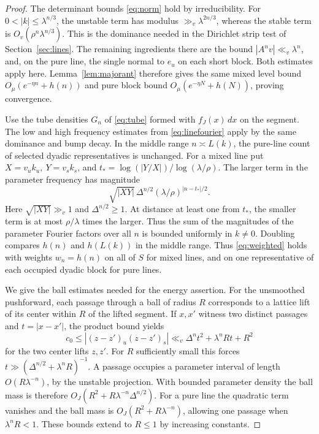 \documentclass[11pt,a4paper,reqno]{amsart}
\theoremstyle{definition}
\theoremstyle{remark}
\numberwithin{equation}{section}
\begin{document}
\begin{proof}
The determinant bounds \eqref{eq:norm} hold by irreducibility.
For \(0<|k|\le\lambda^{n/3}\), the unstable term has modulus
\(\gg_v\lambda^{2n/3}\), whereas the stable term is
\(O_v(\rho^n\lambda^{n/3})\). This is the dominance needed
in the Dirichlet strip test of Section~\ref{sec:lines}.
The remaining ingredients there are the bound
\(|A^n v|\ll_v\lambda^n\), and, on the pure line, the single
normal to \(e_u\) on each short block. Both estimates apply
here. Lemma~\ref{lem:majorant} therefore gives the same mixed
level bound \(O_\mu(e^{-\eta n}+h(n))\) and pure block bound
\(O_\mu(e^{-\eta N}+h(N))\), proving convergence.

Use the tube densities \(G_n\) of \eqref{eq:tube} formed with
\(f_J(x)\,dx\) on the segment. The low and high frequency
estimates from \eqref{eq:linefourier} apply by the same dominance
and bump decay. In the middle range \(n\asymp L(k)\), the
pure-line count of selected dyadic representatives is unchanged.
For a mixed line put
\(X=v_u k_u,\ Y=v_s k_s\), and
\(t_*=\log(|Y/X|)/\log(\lambda/\rho)\). The larger term in the
parameter frequency has magnitude
\[
 \sqrt{|XY|}\,\Delta^{n/2}(\lambda/\rho)^{|n-t_*|/2}.
\]
Here \(\sqrt{|XY|}\gg_v1\) and \(\Delta^{n/2}\ge1\). At distance
at least one from \(t_*\), the smaller term is at most
\(\rho/\lambda\) times the larger. Thus the sum of the magnitudes
of the parameter Fourier factors over all \(n\) is bounded
uniformly in \(k\ne0\). Doubling compares \(h(n)\) and
\(h(L(k))\) in the middle range. Thus \eqref{eq:weighted}
holds with weights \(w_n=h(n)\) on all of \(S\) for mixed
lines, and on one representative of each occupied dyadic
block for pure lines.

We give the ball estimates needed for the energy assertion.
For the unsmoothed pushforward, each passage through a ball of
radius \(R\) corresponds to a lattice lift of its center within
\(R\) of the lifted segment. If \(x,x'\) witness two distinct
passages and \(t=|x-x'|\), the product bound yields
\begin{equation}\label{eq:nonunit-passage}
 c_0\le |(z-z')_u(z-z')_s|
 \ll_v \Delta^n t^2+\lambda^nRt+R^2
\end{equation}
for the two center lifts \(z,z'\). For \(R\) sufficiently small
this forces \(t\gg(\Delta^{n/2}+\lambda^nR)^{-1}\). A passage
occupies a parameter interval of length \(O(R\lambda^{-n})\),
by the unstable projection. With bounded parameter density the
ball mass is therefore \(O_J(R^2+R\lambda^{-n}\Delta^{n/2})\).
For a pure line the quadratic term vanishes and the ball mass
is \(O_J(R^2+R\lambda^{-n})\), allowing one passage when
\(\lambda^nR<1\). These bounds extend to \(R\le1\) by increasing
constants.


\end{proof}
\end{document}
